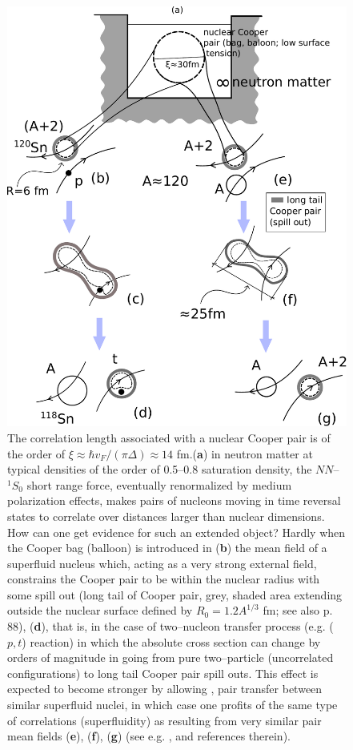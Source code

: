 \begin{figure}
	\centerline{\includegraphics*[width=13cm,angle=0]{nutshell/figs/fig_gamma.pdf}}
\caption{The correlation length associated with a nuclear Cooper pair is of the order of $\xi\approx \hbar v_F/(\pi\Delta)\approx 14 $ fm.(\textbf{a}) in neutron matter at typical densities of the order of 0.5--0.8 saturation density, the $NN$--$^{1}S_0$ short range force, eventually renormalized by medium polarization effects, makes pairs of nucleons moving in time reversal states to correlate over distances larger than nuclear dimensions. How can one get evidence for such an extended object? Hardly when the Cooper bag (balloon) is introduced in (\textbf{b}) the mean field  of a superfluid nucleus which, acting as a very strong external field, constrains the Cooper pair to be within the nuclear radius with some spill out (long tail of Cooper pair, grey, shaded area extending outside the nuclear surface defined by $R_0=1.2A^{1/3}$ fm; see also \cite{Bertsch:05} p. 88), (\textbf{d}), that is,  in the case of two--nucleon transfer process (e.g. ($p,t$) reaction) in which the absolute cross section can change by orders of magnitude in going from pure two--particle (uncorrelated configurations) to long tail Cooper pair spill outs. This effect is expected to become stronger by allowing , pair transfer between similar superfluid nuclei, in which case one profits of the same type of correlations (superfluidity) as resulting from very similar pair mean fields (\textbf{e}), (\textbf{f}), (\textbf{g}) (see e.g. \cite{Oertzen:13,vonOertzen:01}, and references therein).}\label{fig_gamma}
\end{figure}
